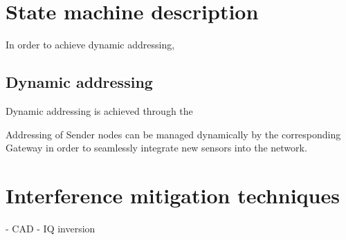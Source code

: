 \section{State machine description}
In order to achieve dynamic addressing, 

\subsection{Dynamic addressing}
Dynamic addressing is achieved through the 

Addressing of
Sender nodes can be managed dynamically by the corresponding Gateway in order to seamlessly integrate new sensors into
the network.

\section{Interference mitigation techniques}
- CAD
- IQ inversion

